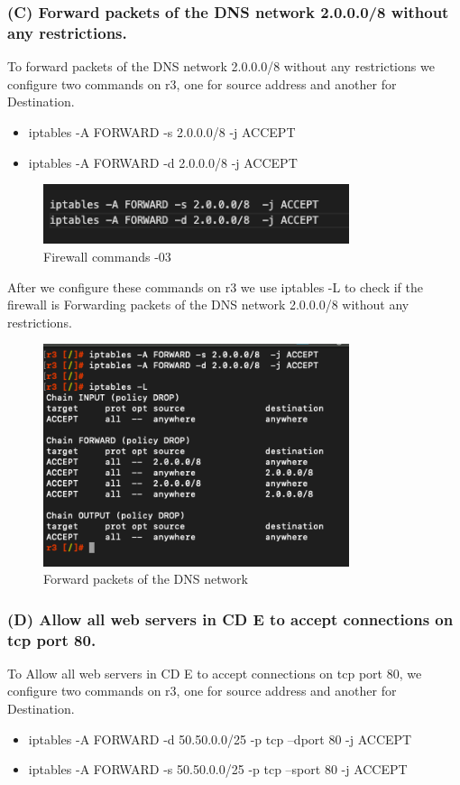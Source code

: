 \subsubsection{(C) Forward packets of the DNS network 2.0.0.0/8 without any restrictions.}
To forward packets of the DNS network 2.0.0.0/8 without any restrictions we configure two commands on r3, one for source address and another for Destination.
\begin{itemize}
\item iptables -A FORWARD -s 2.0.0.0/8  -j ACCEPT
\item iptables -A FORWARD -d 2.0.0.0/8  -j ACCEPT 
\end{itemize}

\begin{figure}[H]
\centering
  \includegraphics[width=0.8\textwidth]{Images/Firewall commands -03.png}
  \caption{Firewall commands -03}
  \label{fig }
\end{figure}
After we configure these commands on r3 we use iptables -L to check if the firewall is 
Forwarding packets of the DNS network 2.0.0.0/8 without any restrictions.
\begin{figure}[H]
\centering
  \includegraphics[width=0.8\textwidth]{Images/Forward packets of the DNS network 2.0.0.0:8 without any restrictions..png}
  \caption{Forward packets of the DNS network}
  \label{fig }
\end{figure}

\subsubsection{(D) Allow all web servers in CD E to accept connections on tcp port 80.}
To Allow all web servers in CD E to accept connections on tcp port 80, we configure two commands on r3, one for source address and another for Destination.
\begin{itemize}
\item iptables -A FORWARD -d 50.50.0.0/25 -p tcp --dport 80 -j ACCEPT 
\item iptables -A FORWARD -s 50.50.0.0/25 -p tcp --sport 80 -j ACCEPT 
\end{itemize}

